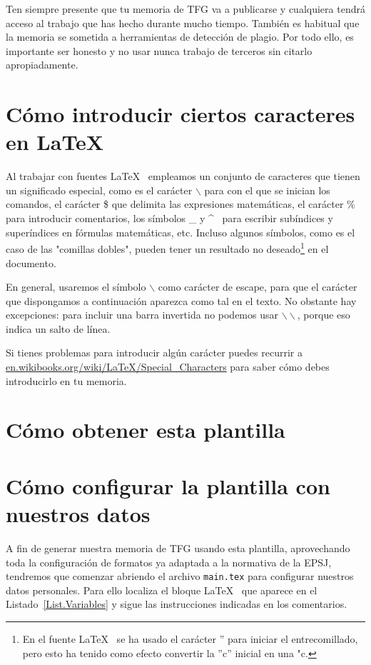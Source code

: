 Ten siempre presente que tu memoria de TFG va a publicarse y cualquiera tendrá acceso al trabajo que has hecho durante mucho tiempo. También es habitual que la memoria se sometida a herramientas de detección de plagio. Por todo ello, es importante ser honesto y no usar nunca trabajo de terceros sin citarlo apropiadamente.

\section{Cómo introducir ciertos caracteres en \LaTeX}

Al trabajar con fuentes \LaTeX~ empleamos un conjunto de caracteres que tienen un significado especial, como es el carácter $\backslash$ para con el que se inician los comandos, el carácter \$ que delimita las expresiones matemáticas, el carácter \% para introducir comentarios, los símbolos \_ y \^~ para escribir subíndices y superíndices en fórmulas matemáticas, etc. Incluso algunos símbolos, como es el caso de las "comillas dobles", pueden tener un resultado no deseado\footnote{En el fuente \LaTeX~ se ha usado el carácter '' para iniciar el entrecomillado, pero esto ha tenido como efecto convertir la ''c'' inicial en una "c.} en el documento.

En general, usaremos el símbolo $\backslash$ como carácter de escape, para que el carácter que dispongamos a continuación aparezca como tal en el texto. No obstante hay excepciones: para incluir una barra invertida no podemos usar $\backslash\backslash$, porque eso indica un salto de línea.

Si tienes problemas para introducir algún carácter puedes recurrir a \url{en.wikibooks.org/wiki/LaTeX/Special_Characters} para saber cómo debes introducirlo en tu memoria.

\section{Cómo obtener esta plantilla}

\section{Cómo configurar la plantilla con nuestros datos}

A fin de generar nuestra memoria de TFG usando esta plantilla, aprovechando toda la configuración de formatos ya adaptada a la normativa de la EPSJ, tendremos que comenzar abriendo el archivo \texttt{main.tex} para configurar nuestros datos personales. Para ello localiza el bloque \LaTeX~ que aparece en el Listado~\ref{List.Variables} y sigue las instrucciones indicadas en los comentarios.

